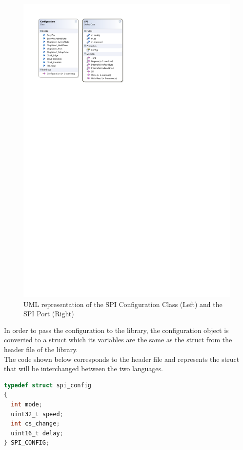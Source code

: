 \begin{figure}[H]\begin{center}
 \centering
  \captionsetup{justification=centering}
  \includegraphics[scale=1]{pictures/iosharp/spi-uml}
  \caption{UML representation of the SPI Configuration Class (Left) and the SPI Port (Right) \label{fig:spi-uml}}
\end{center}\end{figure}

In order to pass the configuration to the library, the configuration object is converted to a struct which its variables are the same as the struct from the header file of the library.
\\
The code shown below corresponds to the header file and represents the struct that will be interchanged between the two languages.

\begin{lstlisting}[language=C, caption={IOSharp.h - spi\_config struct}]
typedef struct spi_config
{
  int mode;
  uint32_t speed;
  int cs_change;
  uint16_t delay;
} SPI_CONFIG;
\end{lstlisting}

